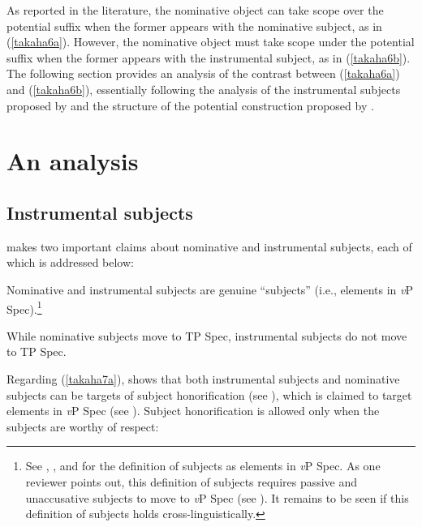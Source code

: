 \documentclass[output=paper]{langscibook}
\begin{document}
As reported in the literature, the nominative object can take scope over the potential suffix when the former appears with the nominative subject, as in (\ref{takaha6a}). However, the nominative object must take scope under the potential suffix when the former appears with the instrumental subject, as in (\ref{takaha6b}). The following section provides an analysis of the contrast between (\ref{takaha6a}) and (\ref{takaha6b}), essentially following the analysis of the instrumental subjects proposed by \citet{Kishimoto2010} and the structure of the potential construction proposed by \citet{shimamurawurmbrand2014}.

\section{An analysis}\label{takahas3}\largerpage[2]

\subsection{Instrumental subjects}
\citet{Kishimoto2010} makes two important claims about nominative and instrumental subjects, each of which is addressed below:

\begin{exe}
\ex 
\begin{xlist}
\ex \label{takaha7a}
Nominative and instrumental subjects are genuine “subjects” (i.e., elements in \emph{v}P Spec).\footnote{See \citet{Saito2006a}, \citet{Takano2011}, and \citet{Kishimoto2012} for the definition of subjects as elements in \emph{v}P Spec. As one reviewer points out, this definition of subjects requires passive and unaccusative subjects to move to \emph{v}P Spec (see \citealt{Saito2006a, Takano2011, Kishimoto2012}). It remains to be seen if this definition of subjects holds cross-linguistically.} 

\ex \label{takaha7b}
While nominative subjects move to TP Spec, instrumental subjects do not move to TP Spec.

\end{xlist}
\end{exe}

Regarding (\ref{takaha7a}), \citet{Kishimoto2010} shows that both instrumental subjects and nominative subjects can be targets of subject honorification (see \citealt{Harada1976, Shibatani1978}), which is claimed to target elements in \emph{v}P Spec (see \citealt{Takano2011, Kishimoto2012}). Subject honorification is allowed only when the subjects are worthy of respect:
\end{document}
